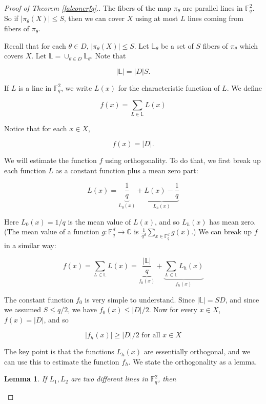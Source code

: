 \documentclass[12pt]{amsart}
\newtheorem{lemma}[theorem]{Lemma}
\newcommand{\FF}{\mathbb{F}}
\newcommand{\CC}{\mathbb{C}}
\newcommand{\LL}{\mathbb{L}}
\begin{document}
\begin{proof} [Proof of Theorem \ref{falconerfq}.]
    
The fibers of the map $\pi_\theta$ are parallel lines in $\FF_q^2$.  So if $|\pi_\theta(X)| \le S$, then we can cover $X$ using at most $L$ lines coming from fibers of $\pi_\theta$.

Recall that for each $\theta \in D$, $| \pi_\theta(X)| \le S$.  Let $\LL_\theta$ be a set of $S$ fibers of $\pi_\theta$ which covers $X$.  Let $\LL = \cup_{\theta \in D} \LL_\theta$.  Note that

$$ | \LL | = |D| S.$$

If $L$ is a line in $\FF_q^2$, we write $L(x)$ for the characteristic function of $L$.  We define

$$ f(x) = \sum_{L \in \LL} L(x)$$

Notice that for each $x \in X$,

$$ f(x) = |D|. $$

We will estimate the function $f$ using orthogonality.  To do that, we first break up each function $L$ as a constant function plus a mean zero part:

\begin{equation}
L(x) = \underbrace{ \frac{1}{q} }_{L_0(x)} + \underbrace{ L(x) - \frac{1}{q}}_{L_h(x)}
\end{equation}

Here $L_0(x) = 1/q$ is the mean value of $L(x)$, and so $L_h(x)$ has mean zero.  (The mean value of a function $g: \FF_q^d \rightarrow \CC$ is $\frac{1}{q^d} \sum_{x \in \FF_q^d} g(x)$.)  We can break up $f$ in a similar way:

\begin{equation}
f(x) = \sum_{L \in \LL} L(x) = \underbrace{ \frac{|\LL|}{q} }_{f_0(x)} + \underbrace{ \sum_{L \in \LL} L_h(x)}_{f_h(x)}
\end{equation}

The constant function $f_0$ is very simple to understand.  Since $|\LL| = S D$, and since we assumed $S \le q/2$, we have $f_0(x) \le |D|/2$.  Now for every $x \in X$, $f(x) = |D|$, and so

$$ |f_h(x)| \ge |D|/2 \textrm{ for all } x \in X$$

The key point is that the functions $L_h(x)$ are essentially orthogonal, and we can use this to estimate the function $f_h$.  We state the orthogonality as a lemma.

\begin{lemma} \label{orth} If $L_1, L_2$ are two different lines in $\FF_q^2$, then


\end{lemma}
\end{proof}
\end{document}
